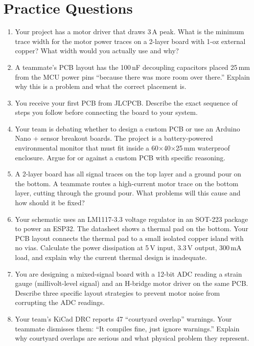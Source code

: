 \documentclass[11pt,letterpaper,twoside,openany]{book}
\begin{document}
\section{Practice Questions}
\begin{enumerate}[leftmargin=1.5em]
\item Your project has a motor driver that draws 3\,A peak. What is the minimum trace width for the motor power traces on a 2-layer board with 1-oz external copper? What width would you actually use and why?
\item A teammate's PCB layout has the 100\,nF decoupling capacitors placed 25\,mm from the MCU power pins ``because there was more room over there.'' Explain why this is a problem and what the correct placement is.
\item You receive your first PCB from JLCPCB. Describe the exact sequence of steps you follow before connecting the board to your system.
\item Your team is debating whether to design a custom PCB or use an Arduino Nano + sensor breakout boards. The project is a battery-powered environmental monitor that must fit inside a 60$\times$40$\times$25\,mm waterproof enclosure. Argue for or against a custom PCB with specific reasoning.
\item A 2-layer board has all signal traces on the top layer and a ground pour on the bottom. A teammate routes a high-current motor trace on the bottom layer, cutting through the ground pour. What problems will this cause and how should it be fixed?
\item Your schematic uses an LM1117-3.3 voltage regulator in an SOT-223 package to power an ESP32. The datasheet shows a thermal pad on the bottom. Your PCB layout connects the thermal pad to a small isolated copper island with no vias. Calculate the power dissipation at 5\,V input, 3.3\,V output, 300\,mA load, and explain why the current thermal design is inadequate.
\item You are designing a mixed-signal board with a 12-bit ADC reading a strain gauge (millivolt-level signal) and an H-bridge motor driver on the same PCB. Describe three specific layout strategies to prevent motor noise from corrupting the ADC readings.
\item Your team's KiCad DRC reports 47 ``courtyard overlap'' warnings. Your teammate dismisses them: ``It compiles fine, just ignore warnings.'' Explain why courtyard overlaps are serious and what physical problem they represent.
\end{enumerate}
\end{document}
